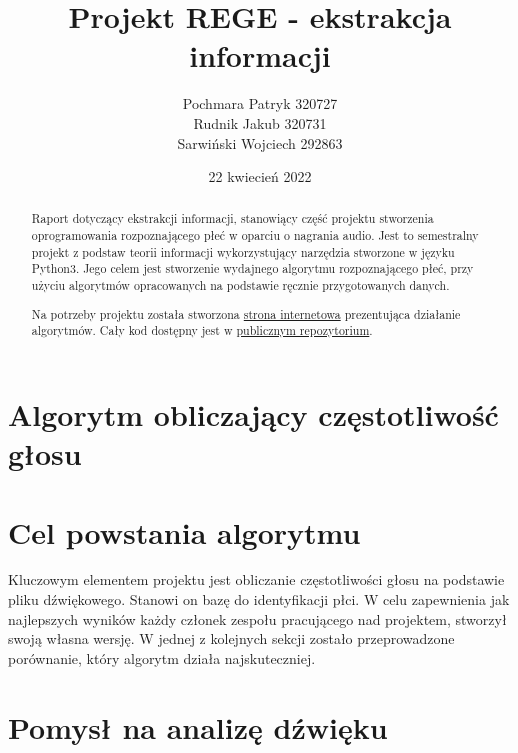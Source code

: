 \documentclass[a4paper,12pt]{extarticle}
\title{Projekt REGE - ekstrakcja informacji}
\author{Pochmara Patryk 320727\\Rudnik Jakub 320731\\Sarwiński Wojciech 292863}
\date{22 kwiecień 2022}
\begin{document}
\maketitle

\begin{abstract}
Raport dotyczący ekstrakcji informacji, stanowiący część projektu stworzenia oprogramowania rozpoznającego płeć w oparciu o nagrania audio. Jest to semestralny projekt z podstaw teorii informacji wykorzystujący narzędzia stworzone w języku Python3. Jego celem jest stworzenie wydajnego algorytmu rozpoznającego płeć, przy użyciu algorytmów opracowanych na podstawie ręcznie przygotowanych danych.
\end{abstract}

\renewcommand{\abstractname}{Strona internetowa}
\begin{abstract}
\noindent Na potrzeby projektu została stworzona \href{https://zeraye.github.io/rege/}{strona internetowa} prezentująca działanie algorytmów. Cały kod dostępny jest w \href{https://github.com/zeraye/rege}{publicznym repozytorium}.
\end{abstract}

\clearpage

\tableofcontents

\clearpage

\section{Algorytm obliczający częstotliwość głosu}
\label{sec:algo}
    
\section*{Cel powstania algorytmu}

Kluczowym elementem projektu jest obliczanie częstotliwości głosu na podstawie pliku dźwiękowego. Stanowi on bazę do identyfikacji płci. W celu zapewnienia jak najlepszych wyników każdy członek zespołu pracującego nad projektem, stworzył swoją własna wersję. W jednej z kolejnych sekcji zostało przeprowadzone porównanie, który algorytm działa najskuteczniej.

\section*{Pomysł na analizę dźwięku}
\end{document}
